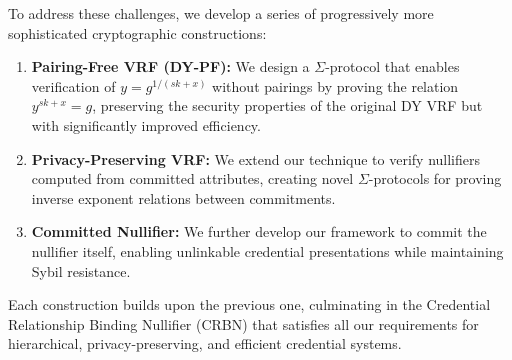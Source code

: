 To address these challenges, we develop a series of progressively more sophisticated cryptographic constructions:

\begin{enumerate}
    \item \textbf{Pairing-Free VRF (DY-PF):} We design a $\Sigma$-protocol that enables verification of $y = g^{1/(sk+x)}$ without pairings by proving the relation $y^{sk+x} = g$, preserving the security properties of the original DY VRF but with significantly improved efficiency.
    
    \item \textbf{Privacy-Preserving VRF:} We extend our technique to verify nullifiers computed from committed attributes, creating novel $\Sigma$-protocols for proving inverse exponent relations between commitments.
    
    \item \textbf{Committed Nullifier:} We further develop our framework to commit the nullifier itself, enabling unlinkable credential presentations while maintaining Sybil resistance.
\end{enumerate}

Each construction builds upon the previous one, culminating in the Credential Relationship Binding Nullifier (CRBN) that satisfies all our requirements for hierarchical, privacy-preserving, and efficient credential systems.































































